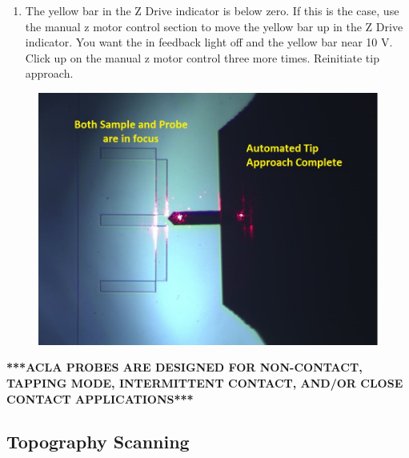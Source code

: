 \documentclass{../lab}
\begin{document}
\begin{enumerate}
\begin{itemize}
\begin{enumerate}
            \item The yellow bar in the Z Drive indicator is below zero. If this is the case, use the manual z motor control section to move the yellow bar up in the Z Drive indicator. You want the in feedback light off and the yellow bar near 10 V. Click up on the manual z motor control three more times. Reinitiate tip approach.
        \end{enumerate}
    \end{itemize}
    
\end{enumerate}

\begin{figure}[H]
    \centering
    \href{http://experimentationlab.berkeley.edu/sites/default/files/AFMImages/bothfocused.jpg}{\includegraphics[width=0.5\linewidth]{images/bothfocused.jpg}}
    \caption{}
\end{figure}

\textbf{***ACLA PROBES ARE DESIGNED FOR NON-CONTACT, TAPPING MODE, INTERMITTENT CONTACT, AND/OR CLOSE CONTACT APPLICATIONS***}

\subsection{Topography Scanning}
\end{document}
